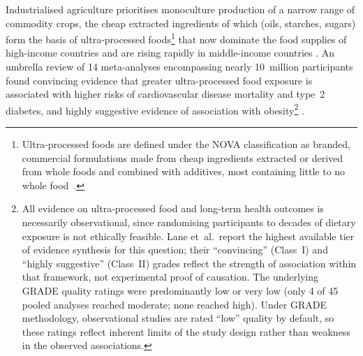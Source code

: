 Industrialised agriculture prioritises monoculture production of a narrow range of commodity crops, the cheap extracted ingredients of which (oils, starches, sugars) form the basis of ultra-processed foods\footnote{Ultra-processed foods are defined under the NOVA classification as branded, commercial formulations made from cheap ingredients extracted or derived from whole foods and combined with additives, most containing little to no whole food~\cite[Panel~1]{monteiro2025upf}.} that now dominate the food supplies of high-income countries and are rising rapidly in middle-income countries \cite[pp.~21,~27]{monteiro2013upf} \cite[Figure~1]{monteiro2025upf}. An umbrella review of 14 meta-analyses encompassing nearly 10~million participants found convincing evidence that greater ultra-processed food exposure is associated with higher risks of cardiovascular disease mortality and type~2 diabetes, and highly suggestive evidence of association with obesity\footnote{All evidence on ultra-processed food and long-term health outcomes is necessarily observational, since randomising participants to decades of dietary exposure is not ethically feasible. Lane et~al.\ report the highest available tier of evidence synthesis for this question; their ``convincing'' (Class~I) and ``highly suggestive'' (Class~II) grades reflect the strength of association within that framework, not experimental proof of causation. The underlying GRADE quality ratings were predominantly low or very low (only 4 of 45 pooled analyses reached moderate; none reached high). Under GRADE methodology, observational studies are rated ``low'' quality by default, so these ratings reflect inherent limits of the study design rather than weakness in the observed associations.} \cite[Figures~2--3]{lane2024upf}.

